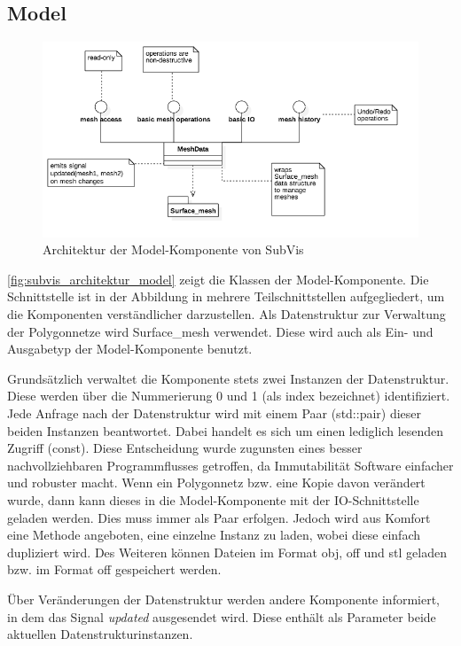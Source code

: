 \subsection{Model}

\begin{figure}
  \centering
  \includegraphics[width=\textwidth]{content/media/subvis_architektur_model.png}
  \caption{Architektur der Model-Komponente von SubVis}
  \label{fig:subvis_architektur_model}
\end{figure}

\autoref{fig:subvis_architektur_model} zeigt die Klassen der Model-Komponente.
Die Schnittstelle ist in der Abbildung in mehrere Teilschnittstellen aufgegliedert, um die Komponenten verständlicher darzustellen.
Als Datenstruktur zur Verwaltung der Polygonnetze wird Surface\_mesh verwendet.
Diese wird auch als Ein- und Ausgabetyp der Model-Komponente benutzt.

Grundsätzlich verwaltet die Komponente stets zwei Instanzen der Datenstruktur.
Diese werden über die Nummerierung 0 und 1 (als index bezeichnet) identifiziert.
Jede Anfrage nach der Datenstruktur wird mit einem Paar (std::pair) dieser beiden Instanzen beantwortet. 
Dabei handelt es sich um einen lediglich lesenden Zugriff (const).
Diese Entscheidung wurde zugunsten eines besser nachvollziehbaren Programmflusses getroffen, da Immutabilität Software einfacher und robuster macht.
Wenn ein Polygonnetz bzw. eine Kopie davon verändert wurde, dann kann dieses in die Model-Komponente mit der IO-Schnittstelle geladen werden.
Dies muss immer als Paar erfolgen. 
Jedoch wird aus Komfort eine Methode angeboten, eine einzelne Instanz zu laden, wobei diese einfach dupliziert wird.
Des Weiteren können Dateien im Format obj, off und stl geladen bzw. im Format off gespeichert werden.

Über Veränderungen der Datenstruktur werden andere Komponente informiert, in dem das Signal \emph{updated} ausgesendet wird. 
Diese enthält als Parameter beide aktuellen Datenstrukturinstanzen.


